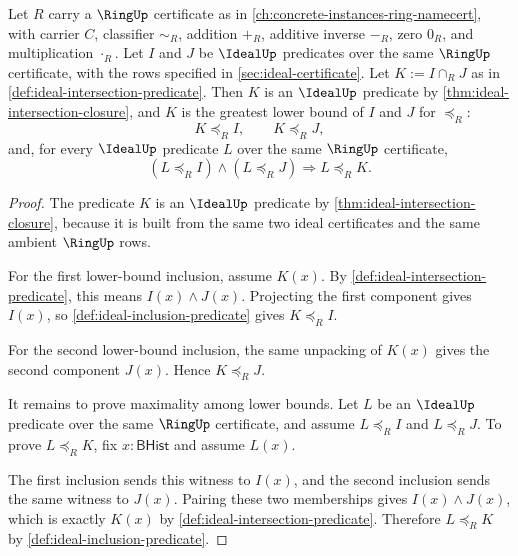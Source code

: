 \begin{theorem}
\label{thm:ideal-intersection-greatest-lower-bound}
Let $R$ carry a $\RingUp$ certificate as in \autoref{ch:concrete-instances-ring-namecert}, with carrier $C$, classifier $\sim_R$, addition $+_R$, additive inverse $-_R$, zero $0_R$, and multiplication $\cdot_R$. Let $I$ and $J$ be $\IdealUp$ predicates over the same $\RingUp$ certificate, with the rows specified in \autoref{sec:ideal-certificate}. Let $K:=I\cap_RJ$ as in \autoref{def:ideal-intersection-predicate}. Then $K$ is an $\IdealUp$ predicate by \autoref{thm:ideal-intersection-closure}, and $K$ is the greatest lower bound of $I$ and $J$ for $\preceq_R$:
$$
K\preceq_RI,\qquad K\preceq_RJ,
$$
and, for every $\IdealUp$ predicate $L$ over the same $\RingUp$ certificate,
$$
(L\preceq_RI)\land(L\preceq_RJ)\Longrightarrow L\preceq_RK.
$$
\end{theorem}
\begin{proof}
The predicate $K$ is an $\IdealUp$ predicate by \autoref{thm:ideal-intersection-closure}, because it is built from the same two ideal certificates and the same ambient $\RingUp$ rows.

For the first lower-bound inclusion, assume $K(x)$. By \autoref{def:ideal-intersection-predicate}, this means $I(x)\land J(x)$. Projecting the first component gives $I(x)$, so \autoref{def:ideal-inclusion-predicate} gives $K\preceq_RI$.

For the second lower-bound inclusion, the same unpacking of $K(x)$ gives the second component $J(x)$. Hence $K\preceq_RJ$.

It remains to prove maximality among lower bounds. Let $L$ be an $\IdealUp$ predicate over the same $\RingUp$ certificate, and assume $L\preceq_RI$ and $L\preceq_RJ$. To prove $L\preceq_RK$, fix $x:\mathsf{BHist}$ and assume $L(x)$.

The first inclusion sends this witness to $I(x)$, and the second inclusion sends the same witness to $J(x)$. Pairing these two memberships gives $I(x)\land J(x)$, which is exactly $K(x)$ by \autoref{def:ideal-intersection-predicate}. Therefore $L\preceq_RK$ by \autoref{def:ideal-inclusion-predicate}.
\end{proof}

